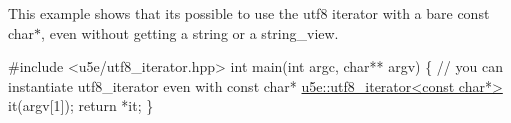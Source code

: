 This example shows that it\textquotesingle{}s possible to use the utf8 iterator with a bare const char$\ast$, even without getting a string or a string\+\_\+view.


\begin{DoxyCode}

\textcolor{preprocessor}{#include <u5e/utf8\_iterator.hpp>}
\textcolor{keywordtype}{int} main(\textcolor{keywordtype}{int} argc, \textcolor{keywordtype}{char}** argv) \{
  \textcolor{comment}{// you can instantiate utf8\_iterator even with const char*}
  \hyperlink{classu5e_1_1utf8__iterator}{u5e::utf8\_iterator<const char*>} it(argv[1]);
  \textcolor{keywordflow}{return} *it;
\}

\end{DoxyCode}
 